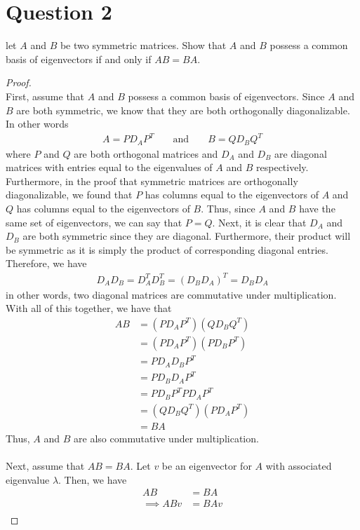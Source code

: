 \documentclass[10pt,a4paper]{article}
\theoremstyle{definition}
\theoremstyle{definition}
\numberwithin{equation}{section}
\begin{document}
\section*{Question 2}
let $A$ and $B$ be two symmetric matrices. Show that $A$ and $B$ possess a common basis of eigenvectors if and only if $AB = BA$. 

\begin{proof}$ $
\\First, assume that $A$ and $B$ possess a common basis of eigenvectors. Since $A$ and $B$ are both symmetric, we know that they are both orthogonally diagonalizable. In other words
\begin{align*}
A = PD_A P^T && \text{ and } && B = QD_B Q^T
\end{align*}
where $P$ and $Q$ are both orthogonal matrices and $D_A$ and $D_B$ are diagonal matrices with entries equal to the eigenvalues of $A$ and $B$ respectively. Furthermore, in the proof that symmetric matrices are orthogonally diagonalizable, we found that $P$ has columns equal to the eigenvectors of $A$ and $Q$ has columns equal to the eigenvectors of $B$. Thus, since $A$ and $B$ have the same set of eigenvectors, we can say that $P = Q$. Next, it is clear that $D_A$ and $D_B$ are both symmetric since they are diagonal. Furthermore, their product will be symmetric as it is simply the product of corresponding diagonal entries. Therefore, we have
\begin{align*}
D_A D_B = D_A^T D_B^T = (D_B D_A)^T = D_B D_A
\end{align*}
in other words, two diagonal matrices are commutative under multiplication. With all of this together, we have that
\begin{align*}
AB &= (PD_A P^T)(QD_B Q^T)\\
&= (PD_A P^T)(PD_B P^T)\\
&= PD_A D_B P^T\\
&= P D_B D_A P^T\\
&= PD_B P^T P D_A P^T\\
&= (QD_B Q^T)(PD_A P^T)\\
&= BA
\end{align*}
Thus, $A$ and $B$ are also commutative under multiplication. 
\\
\\Next, assume that $AB = BA$. Let $v$ be an eigenvector for $A$ with associated eigenvalue $\lambda$. Then, we have
\begin{align*}
AB &= BA\\
\implies ABv &= BAv\\

\end{align*}
\end{proof}
\end{document}
